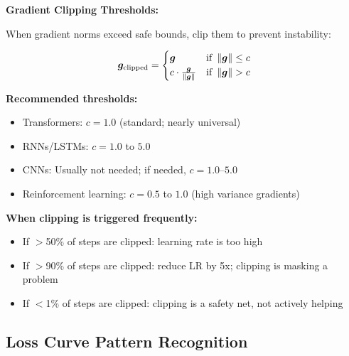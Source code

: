 \documentclass[../../main.tex]{subfiles}
\begin{document}
\begin{keyconcept}
\textbf{Gradient Clipping Thresholds:}

When gradient norms exceed safe bounds, clip them to prevent instability:

\[
    \boldsymbol{g}_{\text{clipped}} = \begin{cases}
        \boldsymbol{g} & \text{if } \left\lVert \boldsymbol{g} \right\rVert \leq c \\
        c \cdot \frac{\boldsymbol{g}}{\left\lVert \boldsymbol{g} \right\rVert} & \text{if } \left\lVert \boldsymbol{g} \right\rVert > c
    \end{cases}
\]

\textbf{Recommended thresholds:}
\begin{itemize}
    \item Transformers: $c = 1.0$ (standard; nearly universal)
    \item RNNs/LSTMs: $c = 1.0$ to $5.0$
    \item CNNs: Usually not needed; if needed, $c = 1.0$--$5.0$
    \item Reinforcement learning: $c = 0.5$ to $1.0$ (high variance gradients)
\end{itemize}

\textbf{When clipping is triggered frequently:}
\begin{itemize}
    \item If $>$50\% of steps are clipped: learning rate is too high
    \item If $>$90\% of steps are clipped: reduce LR by 5x; clipping is masking a problem
    \item If $<$1\% of steps are clipped: clipping is a safety net, not actively helping
\end{itemize}
\end{keyconcept}

\subsection{Loss Curve Pattern Recognition}
\end{document}
